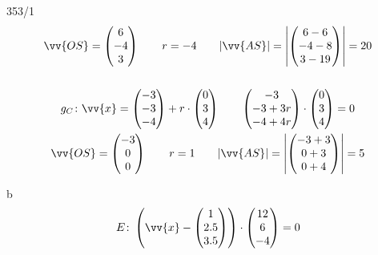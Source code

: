 \begin{exercise}{353/1}
\begin{gather*}
    \vv{OS} = \begin{pmatrix}6 \\ -4 \\ 3\end{pmatrix} \qquad r = -4 \qquad |\vv{AS}| = \left|\begin{pmatrix}6 - 6 \\ -4 - 8  \\ 3 - 19\end{pmatrix}\right| = 20 \\\\
    g_C \colon \vv{x} = \begin{pmatrix}-3 \\ -3 \\ -4\end{pmatrix} + r \cdot \begin{pmatrix}0 \\ 3 \\ 4\end{pmatrix} \qquad \begin{pmatrix}-3 \\ -3 + 3r \\ -4 + 4r\end{pmatrix} \cdot \begin{pmatrix}0 \\ 3 \\ 4\end{pmatrix} = 0 \\
    \vv{OS} = \begin{pmatrix}-3 \\ 0 \\ 0\end{pmatrix} \qquad r = 1 \qquad |\vv{AS}| = \left|\begin{pmatrix}-3 + 3 \\ 0 + 3 \\ 0 + 4\end{pmatrix}\right| = 5
  \end{gather*}
  \item [b]
  \begin{gather*}
    E \colon \left(\vv{x} - \begin{pmatrix}1 \\ 2.5 \\ 3.5\end{pmatrix}\right) \cdot \begin{pmatrix}12 \\ 6 \\ -4\end{pmatrix} = 0 \\

\end{gather*}
\end{exercise}
